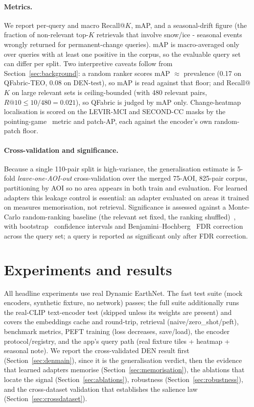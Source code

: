 \documentclass{article}
\begin{document}
\paragraph{Metrics.}
We report per-query and macro Recall@$K$, mAP, and a seasonal-drift figure (the
fraction of non-relevant top-$K$ retrievals that involve snow/ice - seasonal
events wrongly returned for permanent-change queries). mAP is macro-averaged only
over queries with at least one positive in the corpus, so the evaluable query set
can differ per split. Two interpretive caveats follow from
Section~\ref{sec:background}: a random ranker scores mAP $\approx$ prevalence
(0.17 on QFabric-TEO, 0.08 on DEN-test), so mAP is read against that floor; and
Recall@$K$ on large relevant sets is ceiling-bounded (with 480 relevant pairs,
$R@10 \le 10/480 = 0.021$), so QFabric is judged by mAP only. Change-heatmap
localisation is scored on the LEVIR-MCI and SECOND-CC masks by the
pointing-game~\cite{pointinggame} metric and patch-AP, each against the encoder's
own random-patch floor.

\paragraph{Cross-validation and significance.}
Because a single 110-pair split is high-variance, the generalisation estimate is
5-fold \emph{leave-one-AOI-out} cross-validation over the merged 75-AOI,
825-pair corpus, partitioning by AOI so no area appears in both train and
evaluation. For learned adapters this leakage control is essential: an adapter
evaluated on areas it trained on measures memorisation, not retrieval.
Significance is assessed against a Monte-Carlo random-ranking baseline (the
relevant set fixed, the ranking shuffled)~\cite{permtest}, with
bootstrap~\cite{bootstrap} confidence intervals and
Benjamini--Hochberg~\cite{benjaminihochberg} FDR correction across the query
set; a query is reported as significant only after FDR correction.


\section{Experiments and results}
\label{sec:results}

All headline experiments use real Dynamic EarthNet. The fast test suite (mock
encoders, synthetic fixture, no network) passes; the full suite additionally runs
the real-CLIP text-encoder test (skipped unless its weights are present) and covers
the embeddings cache and round-trip, retrieval
(naive/zero\_shot/peft), benchmark metrics, PEFT training (loss decreases,
save/load), the encoder protocol/registry, and the app's query path
(real fixture tiles + heatmap + seasonal note). We report the cross-validated DEN
result first (Section~\ref{sec:denmain}), since it is the generalisation verdict,
then the evidence that learned adapters memorise (Section~\ref{sec:memorisation}),
the ablations that locate the signal (Section~\ref{sec:ablations}), robustness
(Section~\ref{sec:robustness}), and the cross-dataset validation that establishes
the salience law (Section~\ref{sec:crossdataset}).
\end{document}
